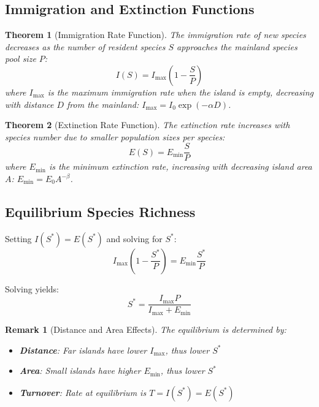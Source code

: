 \documentclass[a4paper, 11pt]{article}
\newtheorem{theorem}{Theorem}[section]
\newtheorem{remark}{Remark}[section]
\begin{document}
\subsection{Immigration and Extinction Functions}

\begin{theorem}[Immigration Rate Function]
The immigration rate of new species decreases as the number of resident species $S$ approaches the
mainland species pool size $P$:
\begin{equation}
I(S) = I_{\max} \left(1 - \frac{S}{P}\right)
\end{equation}
where $I_{\max}$ is the maximum immigration rate when the island is empty, decreasing with distance $D$
from the mainland: $I_{\max} = I_0 \exp(-\alpha D)$.
\end{theorem}

\begin{theorem}[Extinction Rate Function]
The extinction rate increases with species number due to smaller population sizes per species:
\begin{equation}
E(S) = E_{\min} \frac{S}{P}
\end{equation}
where $E_{\min}$ is the minimum extinction rate, increasing with decreasing island area $A$:
$E_{\min} = E_0 A^{-\beta}$.
\end{theorem}

\subsection{Equilibrium Species Richness}

Setting $I(S^*) = E(S^*)$ and solving for $S^*$:
\begin{equation}
I_{\max} \left(1 - \frac{S^*}{P}\right) = E_{\min} \frac{S^*}{P}
\end{equation}

Solving yields:
\begin{equation}
S^* = \frac{I_{\max} P}{I_{\max} + E_{\min}}
\end{equation}

\begin{remark}[Distance and Area Effects]
The equilibrium is determined by:
\begin{itemize}
\item \textbf{Distance}: Far islands have lower $I_{\max}$, thus lower $S^*$
\item \textbf{Area}: Small islands have higher $E_{\min}$, thus lower $S^*$
\item \textbf{Turnover}: Rate at equilibrium is $T = I(S^*) = E(S^*)$
\end{itemize}
\end{remark}
\end{document}
